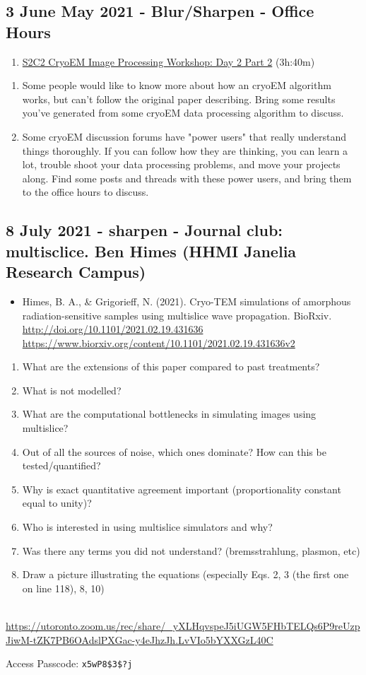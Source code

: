 \documentclass[11pt, oneside]{article}   	%
\begin{document}
\subsection{3 June May 2021 - Blur/Sharpen - Office Hours}
\begin{enumerate}
	\item \href{https://youtu.be/HXIipHORI2Y}{S2C2 CryoEM Image Processing Workshop: Day 2 Part 2} (3h:40m)
	\end{enumerate}
\begin{enumerate}
	\item Some people would like to know more about how an cryoEM algorithm works, but can't follow the original paper describing. Bring some results you've generated from some cryoEM data processing algorithm to discuss.
	\item Some cryoEM discussion forums have "power users" that really understand things thoroughly. If you can follow how they are thinking, you can learn a lot, trouble shoot your data processing problems, and move your projects along. Find some posts and threads with these power users, and bring them to the office hours to discuss.
\end{enumerate}

\subsection{8 July 2021 - sharpen - Journal club: multisclice. Ben Himes (HHMI Janelia Research Campus)}
\begin{itemize}
	\item Himes, B. A., \& Grigorieff, N. (2021). Cryo-TEM simulations of amorphous radiation-sensitive samples using multislice wave propagation. BioRxiv. 
	\\ \url{http://doi.org/10.1101/2021.02.19.431636}
	\\ \url{https://www.biorxiv.org/content/10.1101/2021.02.19.431636v2}
\end{itemize}
\begin{enumerate}
	\item What are the extensions of this paper compared to past treatments?
	\item What is not modelled?
	\item What are the computational bottlenecks in simulating images using multislice?
	\item Out of all the sources of noise, which ones dominate? How can this be tested/quantified?
	\item Why is exact quantitative agreement important (proportionality constant equal to unity)?
	\item Who is interested in using multislice simulators and why?
	\item Was there any terms you did not understand? (bremsstrahlung, plasmon, etc)
	\item Draw a picture illustrating the equations (especially Eqs. 2, 3 (the first one on line 118), 8, 10)
\end{enumerate}

 \\
{\tiny \url{https://utoronto.zoom.us/rec/share/_yXLHqvspeJ5iUGW5FHbTELQs6P9reUzpJiwM-tZK7PB6OAdslPXGac-y4eJhzJh.LvVIo5bYXXGzL40C}}

Access Passcode: \texttt{x5wP8\$3\$?j}
\end{document}
